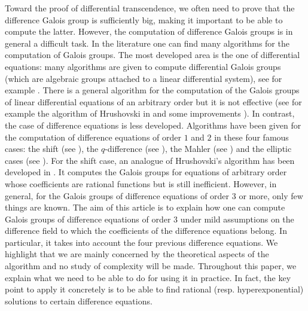 \documentclass[a4paper,11pt]{amsart}
\begin{document}
Toward the proof of differential transcendence, we often need to prove that the difference Galois group is sufficiently  big, making it important to be able to compute the latter. However, the computation of difference Galois groups is in general a difficult task. In the literature one can find many algorithms for the computation of Galois groups. The most developed area is the one of differential equations: many algorithms are given to compute differential Galois groups (which are algebraic groups attached to a linear differential system), see for example \cite{kovacic1986algorithm,singer1993galois,CS99,BCWV,dreyfus2019computing}.
There is a general algorithm for  the computation of the Galois groups of linear differential equations of an arbitrary order but it is not effective  (see for example the algorithm of Hrushovski in \cite{Hru2002} and some improvements  \cite{Feng15,amzallag2022degree}).  In contrast, the case of difference equations is less developed.  
Algorithms have been given for the computation of difference equations of order $1$ and $2$ in these four famous cases: the shift (see \cite{van2006galois,hendriks1998algorithm}), the $q$-difference (see \cite{hendriks1997algorithm}), the Mahler (see \cite{roques2018algebraic}) and the elliptic cases (see \cite{dreyfus2015galois}). For the shift case, an analogue of Hrushovski's algorithm has been developed in \cite{Feng18}. It computes the Galois groups for equations of arbitrary order whose coefficients are rational functions but is still inefficient. However, in general, for the Galois groups of difference equations of order  $3$ or more, only few things are known.  The aim of this article is to explain how one can compute Galois groups of difference equations of order $3$ under mild assumptions on the difference field to which the coefficients of the difference equations belong. In particular, it takes into account the four previous difference equations. We highlight that we are mainly concerned by the theoretical aspects of the algorithm and no study of complexity will be made.   Throughout this paper, we explain what we need to be able to do for using it in practice.   In fact, the key point to apply it concretely is to be able to find rational (resp. hyperexponential)  solutions to certain difference equations.
\end{document}
